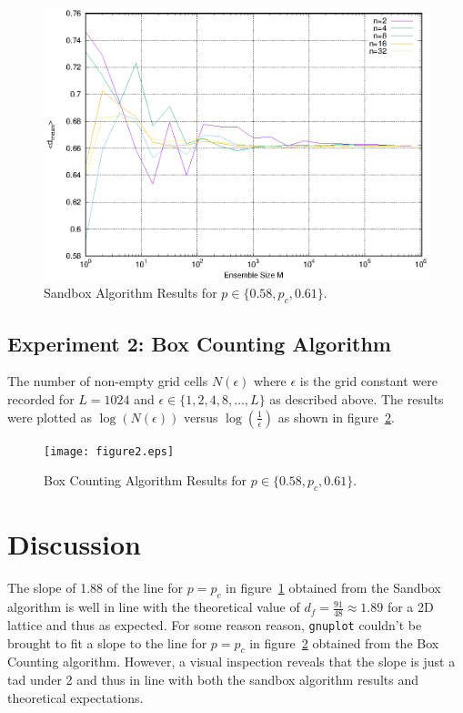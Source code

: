 \documentclass[11pt,a4paper]{article}
\begin{document}
\begin{figure}[ht]
\begin{center}
\includegraphics[scale=0.9]{figure1.eps} 
\end{center}
\caption{Sandbox Algorithm Results for $p \in \{0.58, p_c, 0.61\}$.}
\label{fig:1}
\end{figure}


\subsection{Experiment 2: Box Counting Algorithm}
The number of non-empty grid cells $N(\epsilon)$ where $\epsilon$ is the grid constant were recorded for $L=1024$ and $\epsilon \in \{1, 2, 4, 8, \ldots, L\}$ as described above. The results were plotted as $\log(N(\epsilon))$ versus $\log(\frac{1}{\epsilon})$ as shown in figure~\ref{fig:2}.



\begin{figure}[ht]
\begin{center}
\texttt{[image: figure2.eps]} 
\end{center}
\caption{Box Counting Algorithm Results for $p \in \{0.58, p_c, 0.61\}$.}
\label{fig:2}
\end{figure}

\section{Discussion}
The slope of 1.88 of the line for $p=p_c$ in figure~\ref{fig:1} obtained from the Sandbox algorithm is well in line with the theoretical value of $d_f=\frac{91}{48} \approx 1.89$ for a 2D lattice and thus as expected.
For some reason reason, \texttt{gnuplot} couldn't be brought to fit a slope to the line for $p=p_c$ in figure~\ref{fig:2} obtained from the Box Counting algorithm. However, a visual inspection reveals that the slope is just a tad under 2 and thus in line with both the sandbox algorithm results and theoretical expectations. 
\end{document}
